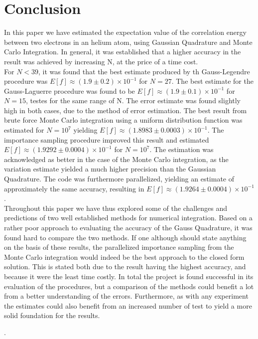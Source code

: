 \documentclass[%
reprint,nofootinbib,
amsmath,amssymb,
aps,
]{revtex4-1}
\begin{document}
\section{Conclusion} \noindent 
In this paper we have estimated the expectation value of the correlation energy between two electrons in an helium atom, using Gaussian Quadrature and Monte Carlo Integration. In general, it was established that a higher accuracy in the result was achieved by increasing N, at the price of a time cost. \\ \indent For $N<39$, it was found that the best estimate produced by th Gauss-Legendre procedure was $E[f] \approx (1.9 \pm 0.2)\times 10^{-1}$ for $N=27$. The best estimate for the Gauss-Laguerre procedure was found to be $E[f]\approx (1.9 \pm 0.1)\times 10^{-1}$ for $N=15$, testes for the same range of N. The error estimate was found slightly high in both cases, due to the method of error estimation. The best result from brute force Monte Carlo integration using a uniform distribution function was estimated for $N=10^7$ yielding $E[f]\approx (1.8983 \pm 0.0003)\times 10^{-1}$. The importance sampling procedure improved this result and estimated $E[f]\approx (1.9292 \pm 0.0004)\times 10^{-1}$ for $N=10^7$. The estimation was acknowledged as better in the case of the Monte Carlo integration, as the variation estimate yielded a much higher precision than the Gaussian Quadrature. The code was furthermore parallelized, yielding an estimate of approximately the same accuracy, resulting in $E[f]\approx (1.9264 \pm 0.0004)\times 10^{-1}$.\\ \indent 
Throughout this paper we have thus explored some of the challenges and predictions of two well established methods for numerical integration. Based on a rather poor approach to evaluating the accuracy of the Gauss Quadrature, it was found hard to compare the two methods. If one although should state anything on the basis of these results, the parallelized importance sampling from the Monte Carlo integration would indeed be the best approach to the closed form solution. This is stated both due to the result having the highest accuracy, and because it were the least time costly. In total the project is found successful in its evaluation of the procedures, but a comparison of the methods could benefit a lot from a better understanding of the errors. Furthermore, as with any experiment the estimates could also benefit from an increased number of test to yield a more solid foundation for the results. 

\newpage. \newpage
\onecolumngrid
\end{document}
